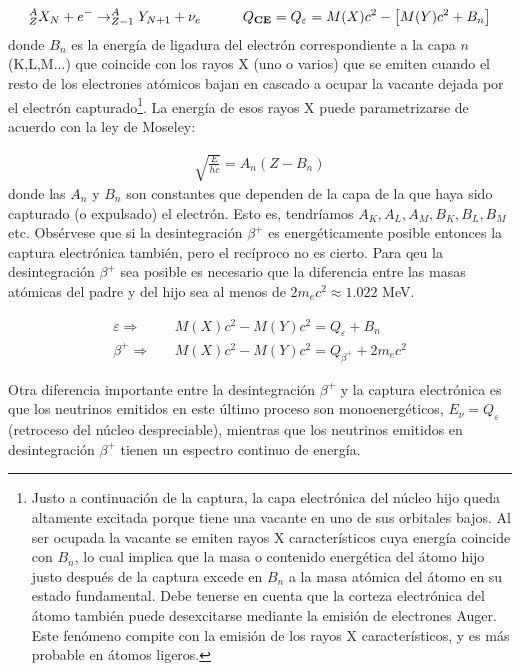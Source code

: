 \begin{equation}
	^A_ZX_N + e^- \rightarrow ^A_{Z-1} Y_{N+1} + \nu_e \quad \quad \quad Q_{\textbf{CE}} = Q_\varepsilon = M(X) c^2 - \left[ M(Y)c^2+ B_n \right]
\end{equation}
donde $B_n$ es la energía de ligadura del electrón correspondiente a la capa $n$ (K,L,M...) que coincide con los rayos X (uno o varios) que se emiten cuando el resto de los electrones atómicos bajan en cascado a ocupar la vacante dejada por el electrón capturado\footnote{Justo a continuación de la captura, la capa electrónica del núcleo hijo queda altamente excitada porque tiene una vacante en uno de sus orbitales bajos. Al ser ocupada la vacante se emiten rayos X característicos cuya energía coincide con $B_n$, lo cual implica que la masa o contenido energética del átomo hijo justo después de la captura excede en $B_n$ a la masa atómica del átomo en su estado fundamental. Debe tenerse en cuenta que la corteza electrónica del átomo también puede desexcitarse mediante la emisión de electrones Auger. Este fenómeno compite con la emisión de los rayos X característicos, y es más probable en átomos ligeros.}. La energía de esos rayos X puede parametrizarse de acuerdo con la ley de Moseley:

\begin{eqnarray}
	\sqrt{\frac{E}{hc}} = A_n (Z-B_n)
\end{eqnarray}	
donde las $A_n$ y $B_n$ son constantes que dependen de la capa de la que haya sido capturado (o expulsado) el electrón. Esto es, tendríamos $A_K,A_L,A_M,B_K,B_L,B_M$ etc. Obsérvese que si la desintegración $\beta^+$ es energéticamente posible entonces la captura electrónica también, pero el recíproco no es cierto. Para qeu la desintegración $\beta^+$ sea posible es necesario que la diferencia entre las masas atómicas del padre y del hijo sea al menos de $2m_e c^2 \approx 1.022$ MeV. 

\begin{equation}
\begin{split}
\varepsilon \Longrightarrow \ \ & \ \ M(X)c^2 - M(Y)c^2 = Q_\varepsilon + B_n\\
\beta^+ \Longrightarrow \ \ & \ \ M(X)c^2- M(Y)c^2  = Q_{\beta^+} + 2m_ec^2
\end{split}
\end{equation}

Otra diferencia importante entre la desintegración $\beta^+$ y la captura electrónica es que los neutrinos emitidos en este último proceso son monoenergéticos, $E_\nu=Q_\varepsilon$ (retroceso del núcleo despreciable), mientras que los neutrinos emitidos en desintegración $\beta^+$ tienen un espectro continuo de energía.

